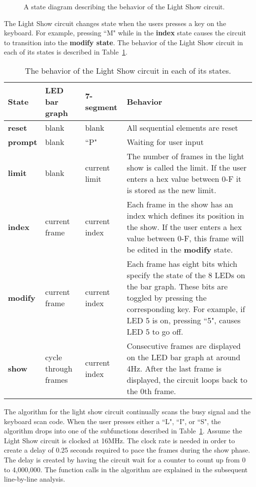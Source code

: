 \begin{figure}[ht]
\caption{A state diagram describing the behavior of the Light Show circuit.}
\label{fig:datapathControlLSbehavior}
\end{figure}

The Light Show circuit changes state when the users presses a key on 
the keyboard. For example, pressing ``M" while in the \textbf{ index } state causes 
the circuit to transition into the \textbf{ modify state}. The behavior of the 
Light Show circuit in each of its states is described in 
Table~\ref{table:LSbehavior}.

\begin{table}
\begin{tabular}{l|l|l|p{2.0in}}
\textbf{ State }	& LED bar graph	& 7-segment	& Behavior 				\\ \hline \hline
\textbf{ reset }	& blank		& blank		& All sequential elements are reset 	\\ \hline
\textbf{ prompt }	& blank		& ``P"		& Waiting for user input		\\ \hline
\textbf{ limit }	& blank		& current limit	& The number of frames in the light show is called 
    the limit. If the user enters a hex value between 0-F it is stored as the new limit. \\  \hline
\textbf{ index }	& current frame	& current index	& Each frame in the show has an index which defines 
    its position in the show. If the user enters a hex value between 0-F, this frame will 
    be edited in the \textbf{ modify } state. 						\\ \hline
\textbf{ modify }	& current frame	& current index	& Each frame has eight bits which specify the state of 
    the 8 LEDs on the bar graph.  These bits are toggled by pressing the corresponding 
    key. For example, if LED 5 is on, pressing ``5", causes LED 5 
    to go off.								\\ \hline
\textbf{ show }	& cycle through frames & current index & Consecutive frames are displayed on the 
    LED bar graph at around 4Hz. After the last frame is displayed, the circuit loops 
    back to the 0th frame. 							\\ 
\end{tabular}
\caption{The behavior of the Light Show circuit in each of its states.}
\label{table:LSbehavior}
\end{table}

The algorithm for the light show circuit continually scans the busy signal 
and the keyboard scan code.  When the user presses either a ``L", 
``I", or ``S", 
the algorithm drops into one of the subfunctions described in 
Table~\ref{table:LSbehavior}.  Assume the Light Show circuit is
clocked at 16MHz.  The clock rate is needed in order to create a delay of
0.25 seconds required to pace the frames during the show phase.  The delay is
created by having the circuit wait for a counter to count up from 0 to 
4,000,000.  The function calls in the algorithm are explained in the 
subsequent line-by-line analysis.


